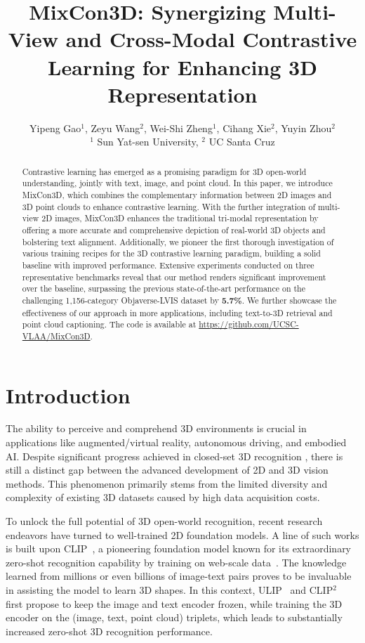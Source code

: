 \documentclass{article} \usepackage{iclr2024_conference,times}
\title{MixCon3D: Synergizing Multi-View and Cross-Modal Contrastive Learning for Enhancing 3D Representation}
\author{Yipeng Gao$^1$, Zeyu Wang$^2$, Wei-Shi Zheng$^1$, Cihang Xie$^2$, Yuyin Zhou$^2$  \vspace{.3em} \\
$^1$ Sun Yat-sen University, $^2$ UC Santa Cruz\\
}
\newcommand{\ourmethod}{MixCon3D}
\begin{document}
\maketitle
\begin{abstract}
Contrastive learning has emerged as a promising paradigm for 3D open-world understanding, jointly with text, image, and point cloud. 
In this paper, we introduce \ourmethod, which combines the complementary information between 2D images and 3D point clouds to enhance contrastive learning. With the further integration of multi-view 2D images, MixCon3D enhances the traditional tri-modal representation by offering a more accurate and comprehensive depiction of real-world 3D objects and bolstering text alignment. Additionally, we pioneer the first thorough investigation of various training recipes for the 3D contrastive learning paradigm, building a solid baseline with improved performance.
Extensive experiments conducted on three representative benchmarks reveal that our method renders significant improvement over the baseline, surpassing the previous state-of-the-art performance on the challenging 1,156-category Objaverse-LVIS dataset by \textbf{5.7\%}. 
We further showcase the effectiveness of our approach in more applications, including text-to-3D retrieval and point cloud captioning.
The code is available at \href{https://github.com/UCSC-VLAA/MixCon3D}{https://github.com/UCSC-VLAA/MixCon3D}.

\end{abstract}

\section{Introduction}
\label{sec:intro}
The ability to perceive and comprehend 3D environments is crucial in applications like augmented/virtual reality, autonomous driving, and embodied AI.
Despite significant progress achieved in closed-set 3D recognition \citep{pu-gcn, dynGCN, gcn_attn, pointnet, pointnet++, pointnext, point-bert, stratified_transformer, point_transformer}, there is still a distinct gap between the advanced development of 2D and 3D vision methods.
This phenomenon primarily stems from the limited diversity and complexity of existing 3D datasets caused by high data acquisition costs. 

To unlock the full potential of 3D open-world recognition,
recent research endeavors have turned to well-trained 2D foundation models. 
A line of such works is built upon CLIP~\citep{openai_clip}, a pioneering foundation model known for its extraordinary zero-shot recognition capability by training on web-scale data~\citep{laion400m, laion5b}. 
The knowledge learned from millions or even billions of image-text pairs proves to be invaluable in assisting the model to learn 3D shapes. 
In this context, ULIP~\citep{ulip} and CLIP$^{2}$~\citep{zeng2023clip2} first propose to keep the image and text encoder frozen, while training the 3D encoder on the (image, text, point cloud) triplets, which leads to substantially increased zero-shot 3D recognition performance. 
\end{document}

